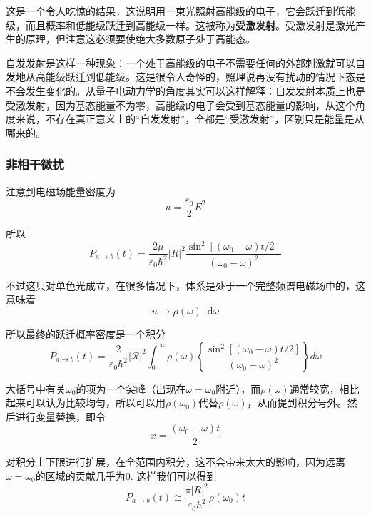 \documentclass[UTF8]{ctexart}
\newcommand*{\dif}{\mathop{}\!\mathrm{d}}
\begin{document}
\noindent 这是一个令人吃惊的结果，这说明用一束光照射高能级的电子，它会跃迁到低能级，而且概率和低能级跃迁到高能级一样。这被称为\textbf{受激发射}。受激发射是激光产生的原理，但注意这必须要使绝大多数原子处于高能态。

    自发发射是这样一种现象：一个处于高能级的电子不需要任何的外部刺激就可以自发地从高能级跃迁到低能级。这是很令人奇怪的，照理说再没有扰动的情况下态是不会发生变化的。从量子电动力学的角度其实可以这样解释：自发发射本质上也是受激发射，因为基态能量不为零，高能级的电子会受到基态能量的影响，从这个角度来说，不存在真正意义上的“自发发射”，全都是“受激发射”，区别只是能量是从哪来的。

    \subsubsection{非相干微扰}
    注意到电磁场能量密度为
    \begin{equation}
        u = \frac{\varepsilon_0}{2} E^2
    \end{equation}

\noindent 所以
\begin{equation}
    P_{a \rightarrow b}(t)=\frac{2 \mu}{\varepsilon_0 \hbar^2} |R|^2 \frac{\sin ^{2}\left[\left(\omega_{0}-\omega\right) t / 2\right]}{\left(\omega_{0}-\omega\right)^{2}}
\end{equation}

    不过这只对单色光成立，在很多情况下，体系是处于一个完整频谱电磁场中的，这意味着
    \begin{equation}
        u \to \rho(\omega) \dif \omega 
    \end{equation}

\noindent 所以最终的跃迁概率密度是一个积分
\begin{equation}
    P_{a \rightarrow b}(t)=\frac{2}{\varepsilon_{0} \hbar^{2}}|\mathcal{R}|^{2} \int_{0}^{\infty} \rho(\omega)\left\{\frac{\sin ^{2}\left[\left(\omega_{0}-\omega\right) t / 2\right]}{\left(\omega_{0}-\omega\right)^{2}}\right\} d \omega
\end{equation}

\noindent 大括号中有关$\omega_0$的项为一个尖峰（出现在$\omega = \omega_0$附近），而$\rho(\omega)$通常较宽，相比起来可以认为比较均匀，所以可以用$\rho(\omega_0)$代替$\rho(\omega)$，从而提到积分号外。然后进行变量替换，即令
\begin{equation}
    x = \frac{(\omega_0 - \omega) t}{2}
\end{equation}

\noindent 对积分上下限进行扩展，在全范围内积分，这不会带来太大的影响，因为远离$\omega = \omega_0$的区域的贡献几乎为0. 这样我们可以得到
\begin{equation}
    P_{a \rightarrow b}(t) \cong \frac{\pi |R|^2}{\varepsilon_0 \hbar^2} \rho(\omega_0) t
\end{equation}
\end{document}
